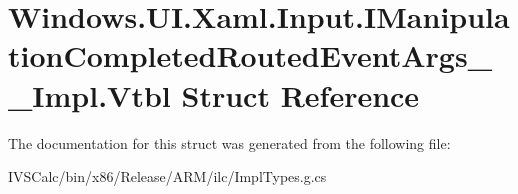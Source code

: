 \hypertarget{struct_windows_1_1_u_i_1_1_xaml_1_1_input_1_1_i_manipulation_completed_routed_event_args_____impl_1_1_vtbl}{}\section{Windows.\+U\+I.\+Xaml.\+Input.\+I\+Manipulation\+Completed\+Routed\+Event\+Args\+\_\+\+\_\+\+Impl.\+Vtbl Struct Reference}
\label{struct_windows_1_1_u_i_1_1_xaml_1_1_input_1_1_i_manipulation_completed_routed_event_args_____impl_1_1_vtbl}


The documentation for this struct was generated from the following file\+:\begin{DoxyCompactItemize}
\item 
I\+V\+S\+Calc/bin/x86/\+Release/\+A\+R\+M/ilc/Impl\+Types.\+g.\+cs\end{DoxyCompactItemize}
